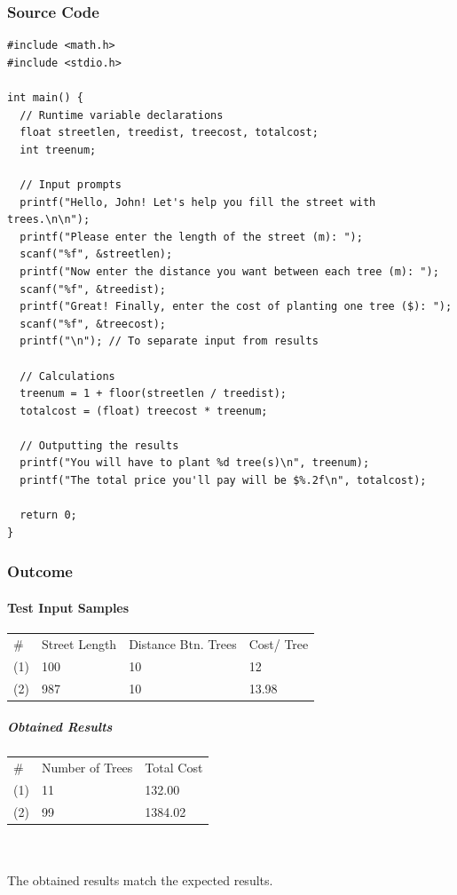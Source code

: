 \documentclass[a4paper,11pt]{article}
\theoremstyle{mytheor}
\begin{document}
\subsubsection{Source Code}
\begin{lstlisting}[label={list:first},title=Program's \texttt{\color{inlinecode}{main.c}} File -- console input/output-oriented application to solve the problem]
#include <math.h>
#include <stdio.h>

int main() {
  // Runtime variable declarations
  float streetlen, treedist, treecost, totalcost;
  int treenum;

  // Input prompts
  printf("Hello, John! Let's help you fill the street with trees.\n\n");
  printf("Please enter the length of the street (m): ");
  scanf("%f", &streetlen);
  printf("Now enter the distance you want between each tree (m): ");
  scanf("%f", &treedist);
  printf("Great! Finally, enter the cost of planting one tree ($): ");
  scanf("%f", &treecost);
  printf("\n"); // To separate input from results

  // Calculations
  treenum = 1 + floor(streetlen / treedist);
  totalcost = (float) treecost * treenum;

  // Outputting the results
  printf("You will have to plant %d tree(s)\n", treenum);
  printf("The total price you'll pay will be $%.2f\n", totalcost);

  return 0;
}
\end{lstlisting}
\newpage
\subsubsection{Outcome}
\paragraph{Test Input Samples\\}

\begin{tabular}{ l l l l }
\# & Street Length & Distance Btn. Trees & Cost/ Tree\\
(1) & 100 & 10 & 12\\
(2) & 987 & 10 & 13.98\\
\end{tabular}
\subparagraph{Obtained Results}

\begin{tabular}{ l l l }
\# & Number of Trees & Total Cost\\
(1) & 11 & 132.00 \\
(2) & 99 & 1384.02 \\
\end{tabular}
\\\\The obtained results match the expected results.
\end{document}

